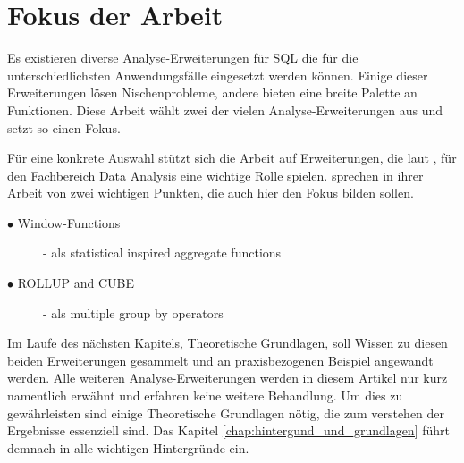 \section{Fokus der Arbeit}
\label{sec:fokus_der_arbeit} Es existieren diverse Analyse-Erweiterungen für SQL
die für die unterschiedlichsten Anwendungsfälle eingesetzt werden können. Einige
dieser Erweiterungen lösen Nischenprobleme, andere bieten eine breite Palette an
Funktionen. Diese Arbeit wählt zwei der vielen Analyse-Erweiterungen aus und setzt
so einen Fokus.

Für eine konkrete Auswahl stützt sich die Arbeit auf Erweiterungen, die laut
\citet[Kapitel3]{FOTACHE2015243}, für den Fachbereich Data Analysis eine wichtige
Rolle spielen. \citet[Kapitel 3]{FOTACHE2015243} sprechen in ihrer Arbeit von
zwei wichtigen Punkten, die auch hier den Fokus bilden sollen.

\begin{description}
	\item[$\bullet$ Window-Functions] - als statistical inspired aggregate functions
		\\ \citep[vgl.][Kapitel 4.3]{FOTACHE2015243}

	\item[$\bullet$ ROLLUP and CUBE] - als multiple group by operators \\ \citep[vgl.][Kapitel4.3]{FOTACHE2015243}
\end{description}

Im Laufe des nächsten Kapitels, Theoretische Grundlagen, soll Wissen zu diesen
beiden Erweiterungen gesammelt und an praxisbezogenen Beispiel angewandt werden.
Alle weiteren Analyse-Erweiterungen werden in diesem Artikel nur kurz namentlich
erwähnt und erfahren keine weitere Behandlung. Um dies zu gewährleisten sind
einige Theoretische Grundlagen nötig, die zum verstehen der Ergebnisse essenziell
sind. Das Kapitel \ref{chap:hintergund_und_grundlagen} führt demnach in alle
wichtigen Hintergründe ein.